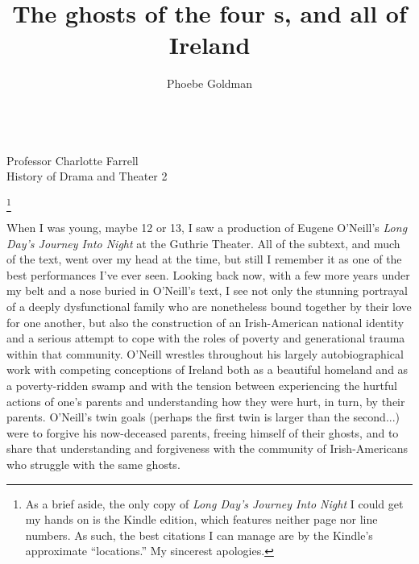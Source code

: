 \documentclass[letterpaper, 12pt]{article}
\title{The ghosts of the four \oneill{}s, and all of Ireland}
\author{Phoebe Goldman}
\date{\DTMDate{2020-05-13}}
\newcommand{\ldjin}{\textit{Long Day's Journey Into Night}}
\newcommand{\oneill}{O'Neill}
\newcommand{\theprof}{Professor Charlotte Farrell}
\newcommand{\theclass}{History of Drama and Theater 2}
\newcommand{\mlatitle}{\noindent\theauthor{}\hspace*{2cm}
\\\noindent\theprof{}\hspace*{2cm}
\\\noindent\theclass{}\hspace*{2cm}
\\\noindent\thedate{}\hspace*{2cm}
\begin{center}
  \thetitle{}\footnote{As a brief aside, the only copy of \ldjin{} I could get my hands on
  is the Kindle edition, which features neither page nor line numbers. As such,
  the best citations I can manage are by the Kindle's approximate
  \enquote{locations.} My sincerest apologies.}
\end{center}}
\begin{document}
\RaggedRight
\thispagestyle{plain}

\mlatitle{}

When I was young, maybe 12 or 13, I saw a production of Eugene \oneill{}'s
\ldjin{} at the Guthrie Theater. All of the subtext, and much of the text, went
over my head at the time, but still I remember it as one of the best
performances I've ever seen. Looking back now, with a few more years under my
belt and a nose buried in \oneill{}'s text, I see not only the stunning
portrayal of a deeply dysfunctional family who are nonetheless bound together
by their love for one another, but also the construction of an Irish-American
national identity and a serious attempt to cope with the roles of poverty and
generational trauma within that community.  \oneill{} wrestles throughout his
largely autobiographical work with competing conceptions of Ireland both as a
beautiful homeland and as a poverty-ridden swamp and with the tension between
experiencing the hurtful actions of one's parents and understanding how they
were hurt, in turn, by their parents. \oneill{}'s twin goals (perhaps the first twin
is larger than the second...) were to forgive his now-deceased parents, freeing
himself of their ghosts, and to share that understanding and forgiveness with
the community of Irish-Americans who struggle with the same ghosts.
\end{document}
